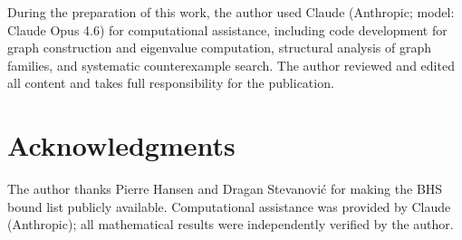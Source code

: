 \documentclass[preprint,12pt]{elsarticle}
\theoremstyle{definition}
\theoremstyle{remark}
\begin{document}
During the preparation of this work, the author used Claude
(Anthropic; model: Claude Opus 4.6) for computational assistance,
including code development for graph construction and eigenvalue
computation, structural analysis of graph families, and systematic
counterexample search. The author reviewed and edited all content and
takes full responsibility for the publication.


\section*{Acknowledgments}

The author thanks Pierre Hansen and Dragan Stevanovi\'{c} for making the
BHS bound list publicly available.  Computational assistance was provided
by Claude (Anthropic); all mathematical results were independently verified
by the author.




\end{document}
